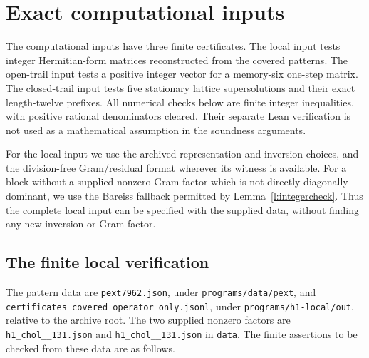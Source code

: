 \section{Exact computational inputs}

The computational inputs have three finite certificates. The local
input tests integer Hermitian-form matrices reconstructed from the
covered patterns. The open-trail input tests a positive integer
vector for a memory-six one-step matrix. The closed-trail input
tests five stationary lattice supersolutions and their exact
length-twelve prefixes. All numerical checks below are finite
integer inequalities, with positive rational denominators cleared.
Their separate Lean verification is not used as a mathematical
assumption in the soundness arguments.

For the local input we use the archived representation and inversion
choices, and the division-free Gram/residual format wherever its
witness is available. For a block without a supplied nonzero Gram
factor which is not directly diagonally dominant, we use the
Bareiss fallback permitted by Lemma~\ref{l:integercheck}. Thus the
complete local input can be specified with the supplied data,
without finding any new inversion or Gram factor.

\subsection*{The finite local verification}
The pattern data are \texttt{pext7962.json}, under
\texttt{programs/data/pext}, and
\texttt{certificates\_covered\_operator\_only.jsonl}, under
\texttt{programs/h1-local/out}, relative to the archive root.
The two supplied nonzero factors are
\texttt{h1\_chol\_\_\allowbreak131.json} and
\texttt{h1\_chol\_\_\allowbreak131.json} in \texttt{data}.
The finite assertions to be checked from these data are as follows.

